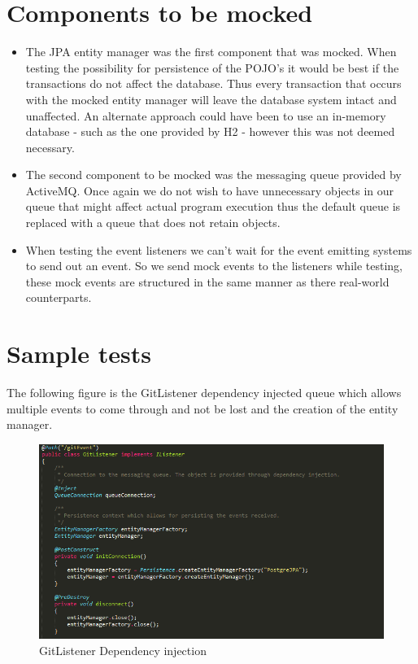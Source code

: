 \documentclass[11pt,a4paper]{article}
\begin{document}
\section{Components to be mocked}
\begin{itemize}
	\item The JPA entity manager was the first component that was mocked. When testing the possibility for persistence of the POJO's it would be best if the transactions do not affect the database. Thus every transaction that occurs with the mocked entity manager will leave the database system intact and unaffected. An alternate approach could have been to use an in-memory database - such as the one provided by H2 - however this was not deemed necessary. \\
	
	\item The second component to be mocked was the messaging queue provided by ActiveMQ. Once again we do not wish to have unnecessary objects in our queue that might affect actual program execution thus the default queue is replaced with a queue that does not retain objects. \\
	
	\item When testing the event listeners we can't wait for the event emitting systems to send out an event. So we send mock events to the listeners while testing, these mock events are structured in the same manner as there real-world counterparts.
\end{itemize}

\section{Sample tests}
The following figure is the GitListener dependency injected queue which allows multiple events to come through and not be lost and the creation of the entity manager.
\begin{figure}[H]
	\begin{center}
		\includegraphics[scale=0.7]{../Images/sample3.PNG}
		\caption{GitListener Dependency injection}
	\end{center}
\end{figure}
\end{document}

